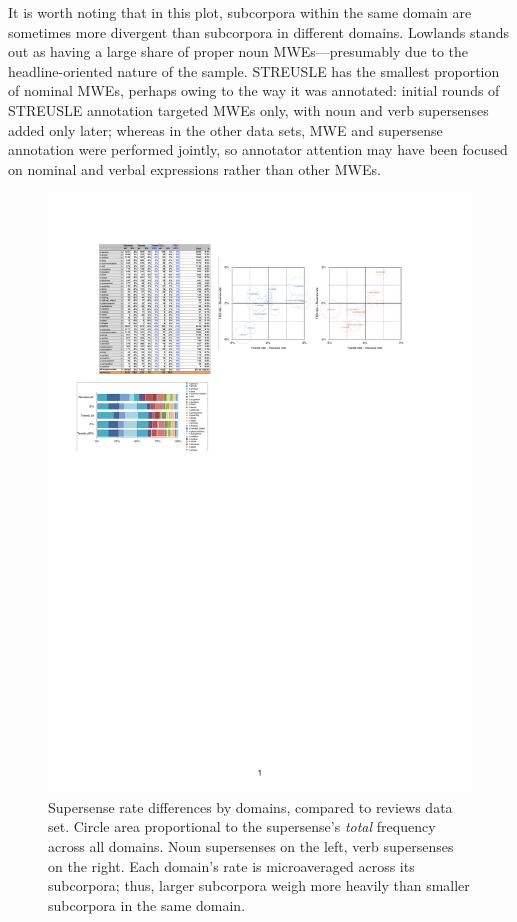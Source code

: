 \documentclass[11pt,letterpaper]{article}
\begin{document}
It is worth noting that in this plot, subcorpora within the same domain 
are sometimes more divergent than subcorpora in different domains. 
Lowlands stands out as having a large share of proper noun MWEs---presumably due to the headline-oriented 
nature of the sample. STREUSLE has the smallest proportion of nominal MWEs, 
perhaps owing to the way it was annotated: 
initial rounds of STREUSLE annotation targeted MWEs only, with noun and verb supersenses 
added only later; whereas in the other data sets, MWE and supersense annotation were performed jointly, 
so annotator attention may have been focused on nominal and verbal expressions 
rather than other MWEs.

\begin{figure}
\includegraphics[width=\textwidth]{figs/supersense-domains.pdf}
\caption{Supersense rate differences by domains, compared to reviews data set. 
Circle area proportional to the supersense's \emph{total} frequency across all domains.
Noun supersenses on the left, verb supersenses on the right. 
Each domain's rate is microaveraged across its subcorpora; 
thus, larger subcorpora weigh more heavily than smaller subcorpora in the same domain.}
\label{fig:supersense-domains}
\end{figure}
\end{document}

